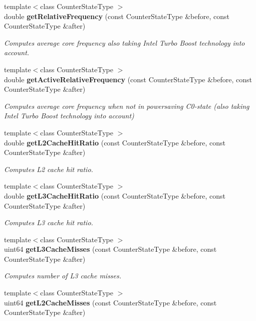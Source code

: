 \begin{DoxyCompactItemize}
{\footnotesize template$<$class Counter\+State\+Type $>$ }\\double \textbf{ get\+Relative\+Frequency} (const Counter\+State\+Type \&before, const Counter\+State\+Type \&after)
\begin{DoxyCompactList}\small\item\em Computes average core frequency also taking Intel Turbo Boost technology into account. \end{DoxyCompactList}\item 
{\footnotesize template$<$class Counter\+State\+Type $>$ }\\double \textbf{ get\+Active\+Relative\+Frequency} (const Counter\+State\+Type \&before, const Counter\+State\+Type \&after)
\begin{DoxyCompactList}\small\item\em Computes average core frequency when not in powersaving C0-\/state (also taking Intel Turbo Boost technology into account) \end{DoxyCompactList}\item 
{\footnotesize template$<$class Counter\+State\+Type $>$ }\\double \textbf{ get\+L2\+Cache\+Hit\+Ratio} (const Counter\+State\+Type \&before, const Counter\+State\+Type \&after)
\begin{DoxyCompactList}\small\item\em Computes L2 cache hit ratio. \end{DoxyCompactList}\item 
{\footnotesize template$<$class Counter\+State\+Type $>$ }\\double \textbf{ get\+L3\+Cache\+Hit\+Ratio} (const Counter\+State\+Type \&before, const Counter\+State\+Type \&after)
\begin{DoxyCompactList}\small\item\em Computes L3 cache hit ratio. \end{DoxyCompactList}\item 
{\footnotesize template$<$class Counter\+State\+Type $>$ }\\uint64 \textbf{ get\+L3\+Cache\+Misses} (const Counter\+State\+Type \&before, const Counter\+State\+Type \&after)
\begin{DoxyCompactList}\small\item\em Computes number of L3 cache misses. \end{DoxyCompactList}\item 
{\footnotesize template$<$class Counter\+State\+Type $>$ }\\uint64 \textbf{ get\+L2\+Cache\+Misses} (const Counter\+State\+Type \&before, const Counter\+State\+Type \&after)

\end{DoxyCompactItemize}
